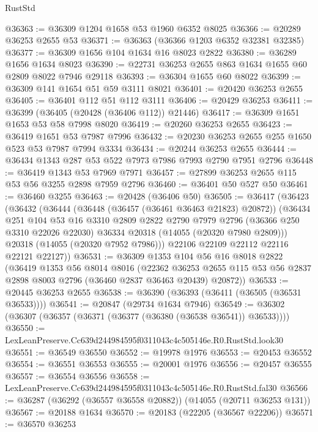 \begin{lexlean}{RustStd}
\begin{coremodule}
@36363 := @36309 @1204 @1658 @53 @1960 @6352 @8025
@36366 := @20289 @36253 @2655 @53
@36371 := @36363 (@36366 @1203 @6352 @32381 @32385)
@36377 := @36309 @1656 @104 @1634 @16 @8023 @2822
@36380 := @36289 @1656 @1634 @8023
@36390 := @22731 @36253 @2655 @863 @1634 @1655 @60 @2809 @8022 @7946 @29118
@36393 := @36304 @1655 @60 @8022
@36399 := @36309 @141 @1654 @51 @59 @3111 @8021
@36401 := @20420 @36253 @2655
@36405 := @36401 @112 @51 @112 @3111
@36406 := @20429 @36253
@36411 := @36399 (@36405 (@20428 (@36406 @112)) @21446)
@36417 := @36309 @1651 @1653 @53 @58 @7998 @8020
@36419 := @20260 @36253 @2655
@36423 := @36419 @1651 @53 @7987 @7996
@36432 := @20230 @36253 @2655 @255 @1650 @523 @53 @7987 @7994 @3334
@36434 := @20244 @36253 @2655
@36444 := @36434 @1343 @287 @53 @522 @7973 @7986 @7993 @2790 @7951 @2796
@36448 := @36419 @1343 @53 @7969 @7971
@36457 := @27899 @36253 @2655 @115 @53 @56 @3255 @2898 @7959 @2796
@36460 := @36401 @50 @527 @50
@36461 := @36460 @3255
@36463 := @20428 (@36406 @50)
@36505 := @36417
    (@36423
      (@36432
        (@36444
          (@36448 (@36457 (@36461 @36463 @21823) @20872))
          (@36434
            @251
            @104
            @53
            @16
            @3310
            @2809
            @2822
            @2790
            @7979
            @2796
            (@36366 @250 @3310 @22026 @22030)
            @36334
            @20318
            (@14055 (@20320 @7980 @2809)))
          @20318
          (@14055 (@20320 @7952 @7986)))
        @22106
        @22109
        @22112
        @22116
        @22121
        @22127))
@36531 := @36309
    @1353
    @104
    @56
    @16
    @8018
    @2822
    (@36419
      @1353
      @56
      @8014
      @8016
      (@22362
        @36253
        @2655
        @115
        @53
        @56
        @2837
        @2898
        @8003
        @2796
        (@36460 @2837 @36463 @20439)
        @20872))
@36533 := @20445 @36253 @2655
@36538 := @36390 (@36393 (@36411 (@36505 (@36531 @36533))))
@36541 := @20847 (@29734 @1634 @7946)
@36549 := @36302 (@36307 (@36357 (@36371 (@36377 (@36380 (@36538 @36541)) @36533))))
@36550 := LexLeanPreserve.Cc639d244984595f0311043c4c505146e.R0.RustStd.look30
@36551 := @36549 @36550
@36552 := @19978 @1976
@36553 := @20453 @36552
@36554 := @36551 @36553
@36555 := @20001 @1976
@36556 := @20457 @36555
@36557 := @36554 @36556
@36558 := LexLeanPreserve.Cc639d244984595f0311043c4c505146e.R0.RustStd.fal30
@36566 := @36287 (@36292 (@36557 @36558 @20882)) (@14055 (@20711 @36253 @131))
@36567 := @20188 @1634
@36570 := @20183 (@22205 (@36567 @22206))
@36571 := @36570 @36253

\end{coremodule}
\end{lexlean}
